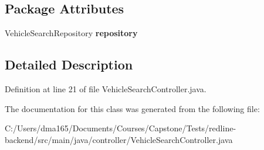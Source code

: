 \subsection*{Package Attributes}
\begin{DoxyCompactItemize}
\item 
\mbox{\label{classcontroller_1_1_vehicle_search_controller_acee955a96f6b59eafcb110a57c1a219c}} 
Vehicle\+Search\+Repository {\bfseries repository}
\end{DoxyCompactItemize}


\subsection{Detailed Description}


Definition at line 21 of file Vehicle\+Search\+Controller.\+java.



The documentation for this class was generated from the following file\+:\begin{DoxyCompactItemize}
\item 
C\+:/\+Users/dma165/\+Documents/\+Courses/\+Capstone/\+Tests/redline-\/backend/src/main/java/controller/Vehicle\+Search\+Controller.\+java\end{DoxyCompactItemize}
